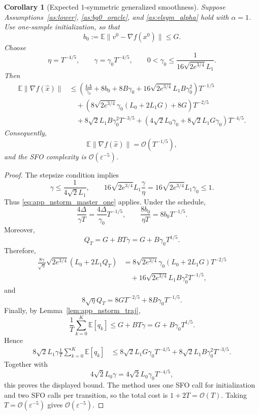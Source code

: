 \documentclass[letter,11pt]{article}
\newtheorem{corollary}{Corollary}[theorem]
\newcommand{\E}{\mathbb{E}}
\newcommand{\Ocal}{\mathcal{O}}
\begin{document}
\begin{corollary}[Expected \(1\)-symmetric generalized smoothness]
\label{cor:app_nstorm_one}
Suppose Assumptions~\ref{as:lower}, \ref{as:bg0_oracle}, and
\ref{as:elsym_alpha} hold with \(\alpha=1\). Use one-sample initialization, so
that
\[
    b_0:=\E\|v^0-\nabla f(x^0)\|\le G.
\]
Choose
\[
    \eta=T^{-4/5},
    \qquad
    \gamma=\gamma_0T^{-4/5},
    \qquad
    0<\gamma_0\le
    \frac{1}{16\sqrt{2e^{3/4}}L_1}.
\]
Then
\[
\begin{aligned}
\E\|\nabla f(\widehat x)\|
&\le
\left(
    \frac{4\Delta}{\gamma_0}
    +8b_0
    +8B\gamma_0
    +16\sqrt{2e^{3/4}}L_1B\gamma_0^2
\right)T^{-1/5}
\\
&\quad
+
\left(
    8\sqrt{2e^{3/4}}\gamma_0(L_0+2L_1G)
    +8G
\right)T^{-2/5}
\\
&\quad
+
8\sqrt2L_1B\gamma_0^2T^{-3/5}
+
\left(
    4\sqrt2L_0\gamma_0
    +8\sqrt2L_1G\gamma_0
\right)T^{-4/5}.
\end{aligned}
\]
Consequently,
\[
    \E\|\nabla f(\widehat x)\|
    =
    \Ocal(T^{-1/5}),
\]
and the SFO complexity is \(\Ocal(\varepsilon^{-5})\).
\end{corollary}

\begin{proof}
The stepsize condition implies
\[
    \gamma\le \frac{1}{4\sqrt2L_1},
    \qquad
    16\sqrt{2e^{3/4}}L_1\frac{\gamma}{\eta}
    =
    16\sqrt{2e^{3/4}}L_1\gamma_0
    \le1.
\]
Thus \eqref{eq:app_nstorm_master_one} applies. Under the schedule,
\[
    \frac{4\Delta}{\gamma T}
    =
    \frac{4\Delta}{\gamma_0}T^{-1/5},
    \qquad
    \frac{8b_0}{\eta T}
    =
    8b_0T^{-1/5}.
\]
Moreover,
\[
    Q_T=G+BT\gamma
    =
    G+B\gamma_0T^{1/5}.
\]
Therefore,
\[
\begin{aligned}
    \frac{8\gamma}{\sqrt\eta}
    \sqrt{2e^{3/4}}
    (L_0+2L_1Q_T)
    &=
    8\sqrt{2e^{3/4}}\gamma_0(L_0+2L_1G)T^{-2/5} \\
    &\quad
    +
    16\sqrt{2e^{3/4}}L_1B\gamma_0^2T^{-1/5},
\end{aligned}
\]
and
\[
    8\sqrt\eta Q_T
    =
    8GT^{-2/5}
    +
    8B\gamma_0T^{-1/5}.
\]
Finally, by Lemma~\ref{lem:app_nstorm_traj},
\[
    \frac1T\sum_{k=0}^K\E[q_k]
    \le
    G+BT\gamma
    =
    G+B\gamma_0T^{1/5}.
\]
Hence
\[
\begin{aligned}
    8\sqrt2L_1\gamma
    \frac1T\sum_{k=0}^K\E[q_k]
    &\le
    8\sqrt2L_1G\gamma_0T^{-4/5}
    +
    8\sqrt2L_1B\gamma_0^2T^{-3/5}.
\end{aligned}
\]
Together with
\[
    4\sqrt2L_0\gamma
    =
    4\sqrt2L_0\gamma_0T^{-4/5},
\]
this proves the displayed bound. The method uses one SFO call for
initialization and two SFO calls per transition, so the total cost is
\(1+2T=\Ocal(T)\). Taking \(T=\Ocal(\varepsilon^{-5})\) gives
\(\Ocal(\varepsilon^{-5})\).
\end{proof}
\end{document}
